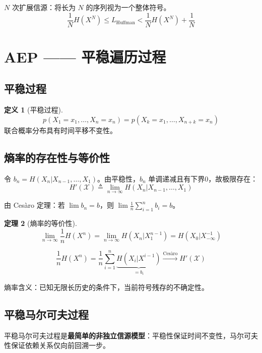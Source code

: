 \documentclass[12pt,a4paper]{ctexart}
\newtheorem{theorem}{定理}[section]
\theoremstyle{definition}
\newtheorem{definition}[theorem]{定义}
\newcommand{\XX}{\mathcal{X}}
\begin{document}
$N$ 次扩展信源：将长为 $N$ 的序列视为一个整体符号。
\[
\frac{1}{N}H(X^N) \leq L_{\mathrm{Huffman}} < \frac{1}{N}H(X^N) + \frac{1}{N}
\]

\section{AEP —— 平稳遍历过程}

\subsection{平稳过程}

\begin{definition}[平稳过程]
\[
p(X_1=x_1,\ldots,X_n=x_n) = p(X_k=x_1,\ldots,X_{n+k}=x_n)
\]
联合概率分布具有时间平移不变性。
\end{definition}

\subsection{熵率的存在性与等价性}

令 $b_n = H(X_n | X_{n-1},\ldots,X_1)$。由平稳性，$b_n$ 单调递减且有下界0，故极限存在：
\[
H'(\XX) \triangleq \lim_{n\to\infty} H(X_n | X_{n-1},\ldots,X_1)
\]

由 Ces\`{a}ro 定理：若 $\lim b_n = b$，则 $\lim \frac{1}{n}\sum_{i=1}^n b_i = b$。

\begin{theorem}[熵率的等价性]
\[
\lim_{n\to\infty} \frac{1}{n}H(X^n) = \lim_{n\to\infty} H(X_n | X_1^{n-1}) = H(X_0 | X_{-\infty}^{-1})
\]
\end{theorem}

\begin{proofbox}
\[
\frac{1}{n}H(X^n) = \frac{1}{n}\sum_{i=1}^{n} \underbrace{H(X_i|X^{i-1})}_{=b_i} \xrightarrow{\text{Ces\`{a}ro}} H'(\XX)
\]
\end{proofbox}

熵率含义：已知无限长历史的条件下，当前符号残存的不确定性。

\subsection{平稳马尔可夫过程}

平稳马尔可夫过程是\textbf{最简单的非独立信源模型}：平稳性保证时间不变性，马尔可夫性保证依赖关系仅向前回溯一步。
\end{document}
